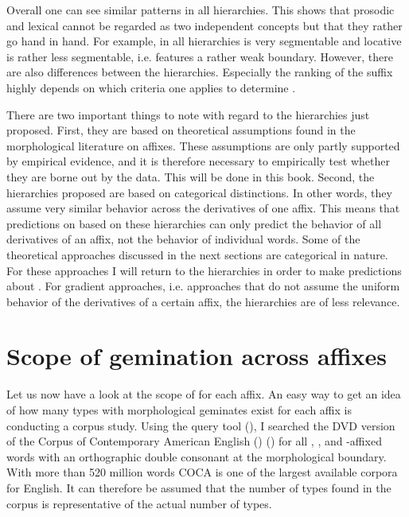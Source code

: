 Overall one can see similar patterns in all hierarchies. This shows that prosodic and lexical  cannot be regarded as two independent concepts but that they rather go hand in hand. For example, in all hierarchies  is very segmentable and locative  is rather less segmentable, i.e. features a rather weak boundary. However, there are also differences between the hierarchies. Especially the ranking of the suffix  highly depends on which criteria one applies to determine .


There are two important things to note with regard to the hierarchies just proposed. First, they are  based on  theoretical assumptions found in the morphological literature on affixes. These assumptions are only partly supported by empirical evidence, and it is therefore necessary to empirically test whether they are borne out by the data. This will be done in this book.
Second, the hierarchies proposed are based on categorical distinctions. In other words, they assume very similar behavior across the derivatives of one affix. This means that predictions on  based on these hierarchies can only predict the behavior of all derivatives of an affix, not the behavior of individual words. Some of the theoretical approaches discussed in the next sections are categorical in nature. For these approaches I will return to the  hierarchies in order to make predictions about . For gradient approaches, i.e. approaches that  do not assume the uniform behavior of the derivatives of a certain affix,  the  hierarchies are of less relevance.


\section{Scope of gemination across affixes} \label{scope of gemination}

Let us now have a look at the scope of  for each affix. An easy way to get an idea of how many types with morphological {geminates} exist for each affix is conducting a corpus study. Using the query tool  (\citealt{Kunter.2016}), I searched the DVD version of the {Corpus of Contemporary American English ()} (\citealt{Davies.20082014}) for all , ,  and -affixed words with an orthographic double consonant at the morphological boundary. With more than 520 million words  {COCA} is one of the largest available corpora for English. It can therefore be assumed that the number of types found in the corpus is representative of the actual number of types.


